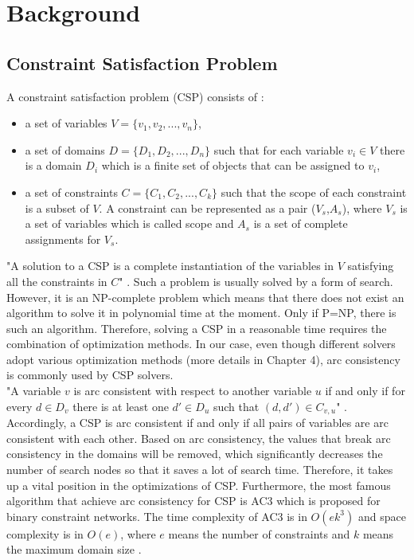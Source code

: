 \chapter{Background}
\label{cha:background}
\section{Constraint Satisfaction Problem}
A constraint satisfaction problem (CSP) consists of \cite{r18}:
\begin{itemize}
  \item a set of variables $V = \{{v_{1}, v_{2},..., v_{n}}\}$,
  \item a set of domains $D = \{D_{1}, D_{2},..., D_{n}\}$ such that for each
variable $v_{i} \in V$ there is a domain $D_{i}$ which is a finite set of objects that can be assigned to $v_{i}$,
  \item a set of constraints $C = \{C_{1}, C_{2},..., C_{k}\}$ such that the scope of each constraint is a subset of $V$. A constraint can be represented as a pair ($V_{s}$,$A_{s}$), where $V_{s}$ is a set of variables which is called scope and $A_{s}$ is a set of complete assignments for $V_{s}$.
\end{itemize}
"A solution to a CSP is a complete instantiation of the variables in $V$ satisfying all the constraints in $C$" \cite{r18}. Such a problem is usually solved by a form of search. However, it is an NP-complete problem which means that there does not exist an algorithm to solve it in polynomial time at the moment. Only if P=NP, there is such an algorithm. Therefore, solving a CSP in a reasonable time requires the combination of optimization methods. In our case, even though different solvers adopt various optimization methods (more details in Chapter 4), arc consistency is commonly used by CSP solvers.\\ 
"A variable $v$ is arc consistent with respect to another variable $u$ if and only if for every $d \in D_{v}$ there is at least one $d'\in D_{u}$ such that $(d,d')\in C_{v,u}$" \cite{r7}. Accordingly, a CSP is arc consistent if and only if all pairs of variables are arc consistent with each other. Based on arc consistency, the values that break arc consistency in the domains will be removed, which significantly decreases the number of search nodes so that it saves a lot of search time. Therefore, it takes up a vital position in the optimizations of CSP. Furthermore, the most famous algorithm that achieve arc consistency for CSP is AC3 which is proposed for binary constraint networks. The time complexity of AC3 is in $O(ek^{3})$ and space complexity is in $O(e)$, where $e$ means the number of constraints and $k$ means the maximum domain size \cite{r11}.
